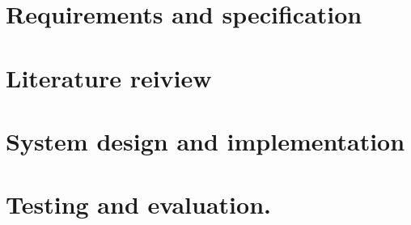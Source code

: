 

\chapter{ Requirements and specification}


\chapter{Literature reiview}


\chapter{System design and implementation}


\chapter{Testing and evaluation.}

